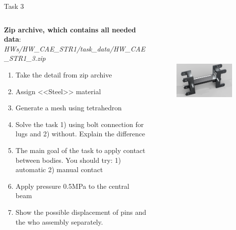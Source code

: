 \documentclass[aspectratio=169]{beamer}
\newcommand{\fbckg}[1]{\usebackgroundtemplate{\texttt{[image: \#1]}}}%
\begin{document}
\begin{frame}[t]{Task 3}
    \vspace{-0.4cm}
    \begin{columns}[T,onlytextwidth]
        \begin{column}{0.54\textwidth}
            \scriptsize
            \textbf{Zip archive, which contains all needed data}: \textit{HWs/HW\_CAE\_STR1/task\_data/HW\_CAE\_STR1\_3.zip}
            \begin{enumerate}
                \item Take the detail from zip archive
                \item Assign <<Steel>> material
                \item Generate a mesh using tetrahedron
                \item Solve the task 1) using bolt connection for lugs and 2) without. Explain the difference
                \item The main goal of the task to apply contact between bodies. You should try: 1) automatic 2) manual contact
                \item Apply pressure 0.5MPa to the central beam
                \item Show the possible displacement of pins and the who assembly separately.
            \end{enumerate}
        \end{column}
        \begin{column}{0.45\textwidth}
            \vspace{0.5cm}
            \begin{figure}[H]
                \centering\includegraphics[height=6cm,width=1\textwidth,keepaspectratio]{HW_CAE_STR1_3.png}
                \label{fig:HW_CAE_STR1_3.png}
            \end{figure}
        \end{column}
    \end{columns}
\end{frame}

\fbckg{fibeamer/figs/last_page.png}
\frame[plain]{}
\end{document}

